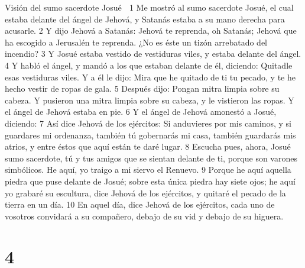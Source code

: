 Visión del sumo sacerdote Josué

1 Me mostró al sumo sacerdote Josué, el cual estaba delante del ángel de Jehová, y Satanás estaba a su mano derecha para acusarle. 
2 Y dijo Jehová a Satanás: Jehová te reprenda, oh Satanás; Jehová que ha escogido a Jerusalén te reprenda. ¿No es éste un tizón arrebatado del incendio?
3 Y Josué estaba vestido de vestiduras viles, y estaba delante del ángel.
4 Y habló el ángel, y mandó a los que estaban delante de él, diciendo: Quitadle esas vestiduras viles. Y a él le dijo: Mira que he quitado de ti tu pecado, y te he hecho vestir de ropas de gala.
5 Después dijo: Pongan mitra limpia sobre su cabeza. Y pusieron una mitra limpia sobre su cabeza, y le vistieron las ropas. Y el ángel de Jehová estaba en pie.
6 Y el ángel de Jehová amonestó a Josué, diciendo:
7 Así dice Jehová de los ejércitos: Si anduvieres por mis caminos, y si guardares mi ordenanza, también tú gobernarás mi casa, también guardarás mis atrios, y entre éstos que aquí están te daré lugar.
8 Escucha pues, ahora, Josué sumo sacerdote, tú y tus amigos que se sientan delante de ti, porque son varones simbólicos. He aquí, yo traigo a mi siervo el Renuevo. 
9 Porque he aquí aquella piedra que puse delante de Josué; sobre esta única piedra hay siete ojos; he aquí yo grabaré su escultura, dice Jehová de los ejércitos, y quitaré el pecado de la tierra en un día.
10 En aquel día, dice Jehová de los ejércitos, cada uno de vosotros convidará a su compañero, debajo de su vid y debajo de su higuera. 

\chapter{4}

